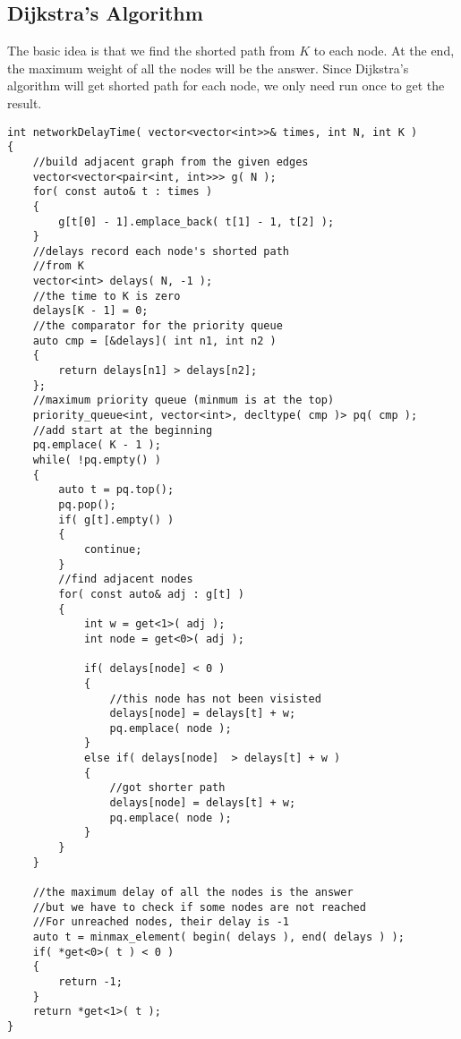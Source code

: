 \subsection{Dijkstra's Algorithm}
The basic idea is that we find the shorted path from $K$ to each node. At the end, the maximum weight of all the nodes will be the answer. Since Dijkstra's algorithm will get shorted path for each node, we only need run once to get the result.

\setcounter{lstlisting}{0}
\begin{lstlisting}[style=customc, caption={Shortest Path}]
int networkDelayTime( vector<vector<int>>& times, int N, int K )
{
    //build adjacent graph from the given edges
    vector<vector<pair<int, int>>> g( N );
    for( const auto& t : times )
    {
        g[t[0] - 1].emplace_back( t[1] - 1, t[2] );
    }
    //delays record each node's shorted path
    //from K
    vector<int> delays( N, -1 );
    //the time to K is zero
    delays[K - 1] = 0;
    //the comparator for the priority queue
    auto cmp = [&delays]( int n1, int n2 )
    {
        return delays[n1] > delays[n2];
    };
    //maximum priority queue (minmum is at the top)
    priority_queue<int, vector<int>, decltype( cmp )> pq( cmp );
    //add start at the beginning
    pq.emplace( K - 1 );
    while( !pq.empty() )
    {
        auto t = pq.top();
        pq.pop();
        if( g[t].empty() )
        {
            continue;
        }
        //find adjacent nodes
        for( const auto& adj : g[t] )
        {
            int w = get<1>( adj );
            int node = get<0>( adj );

            if( delays[node] < 0 )
            {
                //this node has not been visisted
                delays[node] = delays[t] + w;
                pq.emplace( node );
            }
            else if( delays[node]  > delays[t] + w )
            {
                //got shorter path
                delays[node] = delays[t] + w;
                pq.emplace( node );
            }
        }
    }

    //the maximum delay of all the nodes is the answer
    //but we have to check if some nodes are not reached
    //For unreached nodes, their delay is -1
    auto t = minmax_element( begin( delays ), end( delays ) );
    if( *get<0>( t ) < 0 )
    {
        return -1;
    }
    return *get<1>( t );
}
\end{lstlisting}
